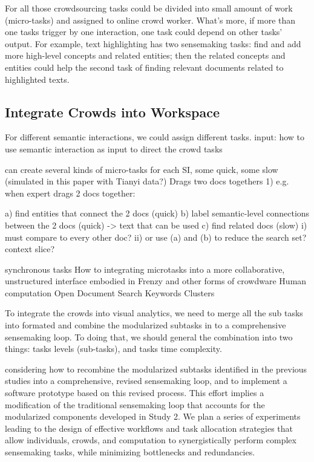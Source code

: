 \documentclass[journal]{vgtc}                %
\begin{document}
For all those crowdsourcing tasks could be divided into small amount of work (micro-tasks) and assigned to online crowd worker. What's more, if more than one tasks trigger by one interaction, one task could depend on other tasks' output. For example, text highlighting has two sensemaking tasks: find and add more high-level concepts and related entities; then the related concepts and entities could help the second task of finding relevant documents related to highlighted texts.


\subsection{Integrate Crowds into Workspace}
For different semantic interactions, we could assign different tasks.
input:  how to use semantic interaction as input to direct the crowd tasks

can create several kinds of micro-tasks for each SI, some quick, some slow  (simulated in this paper with Tianyi data?) \newline
Drags two docs togethers
1) e.g. when expert drags 2 docs together:

a) find entities that connect the 2 docs (quick)
b) label semantic-level connections between the 2 docs (quick) -> text that can be used
c) find related docs (slow)
i) must compare to every other doc?
ii) or use (a) and (b) to reduce the search set?  context slice?\newline

synchronous tasks
How to integrating microtasks into a more collaborative, unstructured interface embodied in Frenzy and other forms of crowdware
Human computation
Open Document
Search Keywords\newline
Clusters \newline

To integrate the crowds into visual analytics, we need to merge all the sub tasks into formated and combine the modularized subtasks in to a comprehensive sensemaking loop. To doing that, we should general the combination into two things: tasks levels (sub-tasks), and  tasks time complexity.

considering how to recombine the modularized subtasks identified in the previous studies into a comprehensive, revised sensemaking loop, and to implement a software prototype based on this revised process.
This effort implies a modification of the traditional sensemaking loop that accounts for the modularized components developed in Study 2.
We plan a series of experiments leading to the design of effective workflows and task allocation strategies that allow individuals, crowds, and computation to synergistically perform complex sensemaking tasks, while minimizing bottlenecks and redundancies.
\end{document}
